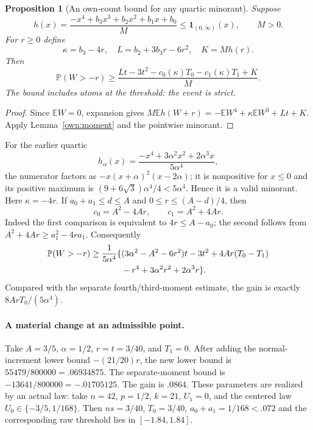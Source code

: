 \documentclass[11pt]{article}
\newtheorem{proposition}[lemma]{Proposition}
\newcommand{\E}{\mathbb E}
\newcommand{\Pp}{\mathbb P}
\begin{document}
\begin{proposition}[An own-count bound for any quartic minorant]
\label{own:quartic}
Suppose
\[
 h(x)=\frac{-x^4+b_3x^3+b_2x^2+b_1x+b_0}{M}
       \le\mathbf1_{(0,\infty)}(x),\qquad M>0.
\]
For $r\ge0$ define
\[
 \kappa=b_3-4r,\quad L=b_2+3b_3r-6r^2,\quad K=Mh(r).
\]
Then
\begin{equation}\label{own:lower}
 \Pp(W>-r)\ge
 \frac{Lt-3t^2-c_0(\kappa)T_0-c_1(\kappa)T_1+K}{M}.
\end{equation}
The bound includes atoms at the threshold: the event is strict.
\end{proposition}
\begin{proof}
Since $\E W=0$, expansion gives
$M\E h(W+r)=-\E W^4+\kappa\E W^3+Lt+K$.
Apply Lemma~\ref{own:moment} and the pointwise minorant.
\end{proof}

For the earlier quartic
\[
 h_\alpha(x)=\frac{-x^4+3\alpha^2x^2+2\alpha^3x}{5\alpha^4},
\]
the numerator factors as $-x(x+\alpha)^2(x-2\alpha)$; it is
nonpositive for $x\le0$ and its positive maximum is
$(9+6\sqrt3)\alpha^4/4<5\alpha^4$. Hence it is a valid minorant.
Here $\kappa=-4r$. If $a_0+a_1\le d\le A$ and
$0\le r\le(A-d)/4$, then
\[
 c_0=A^2-4Ar,\qquad c_1=A^2+4Ar.
\]
Indeed the first comparison is equivalent to $4r\le A-a_0$;
the second follows from $A^2+4Ar\ge a_1^2-4ra_1$.
Consequently
\begin{align}
 \Pp(W>-r)\ge\frac1{5\alpha^4}\{&
 (3\alpha^2-A^2-6r^2)t-3t^2
 +4Ar(T_0-T_1)\notag\\
 &-r^4+3\alpha^2r^2+2\alpha^3r\}.
 \label{own:symmetric}
\end{align}
Compared with the separate fourth/third-moment estimate, the gain is
exactly $8ArT_0/(5\alpha^4)$.

\paragraph{A material change at an admissible point.}
Take $A=3/5$, $\alpha=1/2$, $r=t=3/40$, and $T_1=0$.
After adding the normal-increment lower bound $-(21/20)r$, the new
lower bound is $55479/800000=.06934875$. The separate-moment bound
is $-13641/800000=-.01705125$. The gain is $.0864$.
These parameters are realized by an actual law: take $n=42$, $p=1/2$,
$k=21$, $U_1=0$, and the centered law $U_0\in\{-3/5,1/168\}$.
Then $ns=3/40$, $T_0=3/40$, $a_0+a_1=1/168<.072$ and the
corresponding raw threshold lies in $[-1.84,1.84]$.
\end{document}
